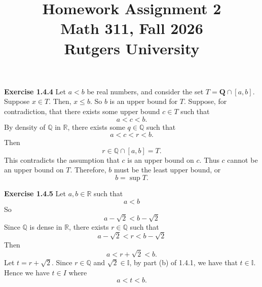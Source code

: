 \documentclass[12pt]{article}
\title{Homework Assignment 2 \\ \large Math 311, Fall 2026 \\ Rutgers University}
\author{}
\date{}
\begin{document}
\maketitle

\noindent{} \textbf{Exercise 1.4.4}
Let $a < b$ be real numbers, and consider the set $T = \mathbf{Q} \cap [a, b]$.
Suppose $x \in T$. Then, $x \leq b$. So $b$ is an upper bound for $T$.
Suppose, for contradiction, that there exists some upper bound $c \in T$ such that
\[
    a < c < b.
\]
By density of $\mathbb{Q}$ in $\mathbb{R}$, there exists some $q \in \mathbb{Q}$ such that
\[
    a < c < r < b.
\]
Then
\[
    r \in \mathbb{Q} \cap [a, b] = T.
\]
This contradicts the assumption that $c$ is an upper bound on $c$.
Thus $c$ cannot be an upper bound on $T$.
Therefore, $b$ must be the least upper bound, or
\[
    b = \sup T.
\]

\noindent{} \textbf{Exercise 1.4.5}
Let $a,b \in \mathbb{R}$ such that
\[
    a < b
\]
So
\[
    a - \sqrt{2} < b - \sqrt{2}
\]
Since $\mathbb{Q}$ is dense in $\mathbb{R}$, there exists $r \in \mathbb{Q}$ such that
\[
    a - \sqrt{2} < r <  b - \sqrt{2}
\]
Then
\[
    a < r + \sqrt{2} < b.
\]
Let $t = r + \sqrt{2}$.
Since $r \in \mathbb{Q}$ and $\sqrt{2} \in \mathbb{I}$, by part (b) of 1.4.1,
we have that $t \in \mathbb{I}$. Hence we have $t \in I$ where
\[
    a < t < b.
\]
\end{document}
